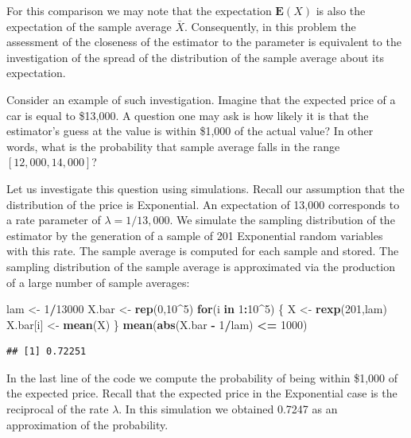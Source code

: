\documentclass[
]{krantz}
\makeatletter
\newenvironment{Shaded}{\begin{snugshade}}{\end{snugshade}}
\newcommand{\ControlFlowTok}[1]{\textcolor[rgb]{0.13,0.29,0.53}{\textbf{#1}}}
\newcommand{\DecValTok}[1]{\textcolor[rgb]{0.00,0.00,0.81}{#1}}
\newcommand{\KeywordTok}[1]{\textcolor[rgb]{0.13,0.29,0.53}{\textbf{#1}}}
\newcommand{\NormalTok}[1]{#1}
\newcommand{\OperatorTok}[1]{\textcolor[rgb]{0.81,0.36,0.00}{\textbf{#1}}}
\newcommand{\StringTok}[1]{\textcolor[rgb]{0.31,0.60,0.02}{#1}}
\newcommand{\Expec}{\mathbf{E}}
\newenvironment{kframe}{%
\medskip{}
\setlength{\fboxsep}{.8em}
 \def\at@end@of@kframe{}%
 \ifinner\ifhmode%
  \def\at@end@of@kframe{\end{minipage}}%
  \begin{minipage}{\columnwidth}%
 \fi\fi%
 \def\FrameCommand##1{\hskip\@totalleftmargin \hskip-\fboxsep
 \colorbox{shadecolor}{##1}\hskip-\fboxsep
     \hskip-\linewidth \hskip-\@totalleftmargin \hskip\columnwidth}%
 \MakeFramed {\advance\hsize-\width
   \@totalleftmargin\z@ \linewidth\hsize
   \@setminipage}}%
 {\par\unskip\endMakeFramed%
 \at@end@of@kframe}
\renewenvironment{Shaded}{\begin{kframe}}{\end{kframe}}
\theoremstyle{definition}
\theoremstyle{definition}
\theoremstyle{definition}
\theoremstyle{remark}
\makeatother
\begin{document}
For this comparison we may note that the expectation \(\Expec(X)\) is also
the expectation of the sample average \(\bar X\). Consequently, in this
problem the assessment of the closeness of the estimator to the
parameter is equivalent to the investigation of the spread of the
distribution of the sample average about its expectation.

Consider an example of such investigation. Imagine that the expected
price of a car is equal to \$13,000. A question one may ask is how
likely it is that the estimator's guess at the value is within \$1,000
of the actual value? In other words, what is the probability that sample
average falls in the range \([12,000, 14,000]\)?

Let us investigate this question using simulations. Recall our
assumption that the distribution of the price is Exponential. An
expectation of 13,000 corresponds to a rate parameter of
\(\lambda = 1/13,000\). We simulate the sampling distribution of the
estimator by the generation of a sample of 201 Exponential random
variables with this rate. The sample average is computed for each sample
and stored. The sampling distribution of the sample average is
approximated via the production of a large number of sample averages:

\begin{Shaded}
\begin{Highlighting}[]
\NormalTok{lam <-}\StringTok{ }\DecValTok{1}\OperatorTok{/}\DecValTok{13000}
\NormalTok{X.bar <-}\StringTok{ }\KeywordTok{rep}\NormalTok{(}\DecValTok{0}\NormalTok{,}\DecValTok{10}\OperatorTok{^}\DecValTok{5}\NormalTok{)}
\ControlFlowTok{for}\NormalTok{(i }\ControlFlowTok{in} \DecValTok{1}\OperatorTok{:}\DecValTok{10}\OperatorTok{^}\DecValTok{5}\NormalTok{) \{}
\NormalTok{  X <-}\StringTok{ }\KeywordTok{rexp}\NormalTok{(}\DecValTok{201}\NormalTok{,lam)}
\NormalTok{  X.bar[i] <-}\StringTok{ }\KeywordTok{mean}\NormalTok{(X)}
\NormalTok{\}}
\KeywordTok{mean}\NormalTok{(}\KeywordTok{abs}\NormalTok{(X.bar }\OperatorTok{-}\StringTok{ }\DecValTok{1}\OperatorTok{/}\NormalTok{lam) }\OperatorTok{<=}\StringTok{ }\DecValTok{1000}\NormalTok{)}
\end{Highlighting}
\end{Shaded}

\begin{verbatim}
## [1] 0.72251
\end{verbatim}

In the last line of the code we compute the probability of being within
\$1,000 of the expected price. Recall that the expected price in the
Exponential case is the reciprocal of the rate \(\lambda\). In this
simulation we obtained 0.7247 as an approximation of the probability.
\end{document}
